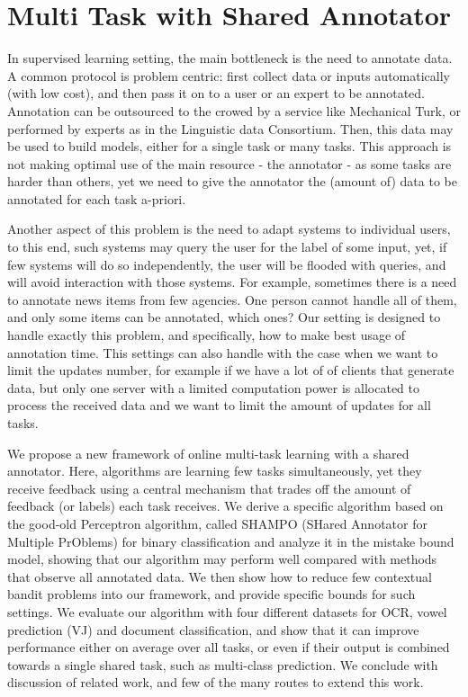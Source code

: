 
\section{Multi Task with Shared Annotator}
\label{sec:selective_sampling}

 In supervised learning setting, the main bottleneck is the need to annotate data. A common protocol is 
 problem centric: first collect data or inputs automatically (with low cost), and then 
 pass it on to a user or an expert to be annotated. Annotation can be outsourced to the crowed by a 
 service like Mechanical Turk, or performed by experts as in the Linguistic data Consortium. Then, this data 
 may be used to build models, either for a single task or many tasks. This approach is not making optimal 
 use of the main resource - the annotator - as some tasks are harder than others, yet we need to give the 
 annotator the (amount of) data to be annotated for each task a-priori. 
 
 Another aspect of this problem is the need to adapt systems to individual users, to this end, 
 such systems may query the user for the label of some input, yet, if few systems will do so 
 independently, the user will be flooded with queries, and will avoid interaction with those systems. 
 For example, sometimes there is a need to annotate news items from few agencies. One person cannot 
 handle all of them, and only some items can be annotated, which ones? Our setting is designed to handle 
 exactly this problem, and specifically, how to make best usage of annotation time.
 This settings can also handle with the case when we want to limit the updates number, 
 for example if we have a lot of of clients that generate data, but only one server with a limited computation 
 power is allocated to process the received data and we want to limit the amount of updates for all tasks.
 
 We propose a new framework of online multi-task learning with a shared annotator. 
 Here, algorithms are learning few tasks simultaneously, yet they receive feedback using a central 
 mechanism that trades off the amount of feedback (or labels) each task receives. We derive a specific 
 algorithm based on the good-old Perceptron algorithm, called SHAMPO (SHared Annotator for Multiple 
 PrOblems) for binary classification and analyze it in the mistake bound model, showing that our algorithm 
 may perform well compared with methods that observe all annotated data. We then show how to reduce 
 few contextual bandit problems into our framework, and provide specific bounds for such 
settings. We evaluate our algorithm with four different datasets for OCR, vowel prediction (VJ) and 
document classification, and show that it can improve performance either on average over all tasks, 
or even if their output is combined towards a single shared task, such as multi-class prediction.
 We conclude with discussion of related work, and few of the many routes to extend this work.
